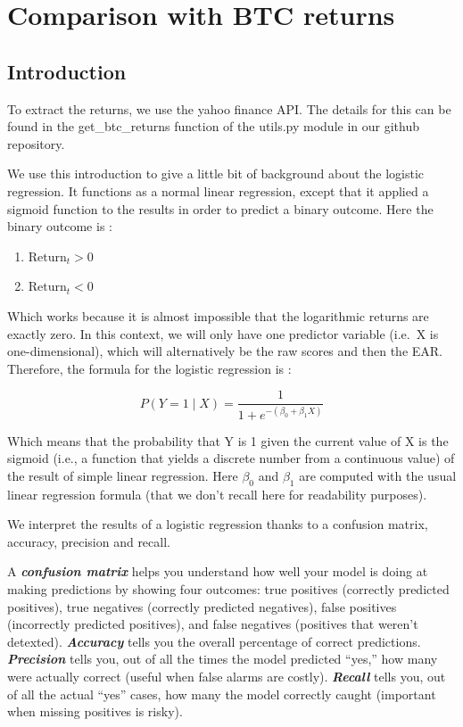 \documentclass[
  a4paper]{article}
\begin{document}
\hypertarget{comparison-with-btc-returns}{%
\section{Comparison with BTC
returns}\label{comparison-with-btc-returns}}

\hypertarget{introduction-1}{%
\subsection{Introduction}\label{introduction-1}}

To extract the returns, we use the yahoo finance
\textcite{yahoo_finance} API. The details for this can be found in the
get\_btc\_returns function of the utils.py module in our github
repository.

We use this introduction to give a little bit of background about the
logistic regression. It functions as a normal linear regression, except
that it applied a sigmoid function to the results in order to predict a
binary outcome. Here the binary outcome is :

\begin{enumerate}
\def\labelenumi{\arabic{enumi}.}
\item
  \(\text{Return}_t > 0\)
\item
  \(\text{Return}_t < 0\)
\end{enumerate}

Which works because it is almost impossible that the logarithmic returns
are exactly zero. In this context, we will only have one predictor
variable (i.e.~X is one-dimensional), which will alternatively be the
raw scores and then the EAR. Therefore, the formula for the logistic
regression is :

\[
P(Y = 1 \mid X) = \frac{1}{1 + e^{-(\beta_0 + \beta_1 X)}}
\]

Which means that the probability that Y is 1 given the current value of
X is the sigmoid (i.e., a function that yields a discrete number from a
continuous value) of the result of simple linear regression. Here
\(\beta_0\) and \(\beta_1\) are computed with the usual linear
regression formula (that we don't recall here for readability purposes).

We interpret the results of a logistic regression thanks to a confusion
matrix, accuracy, precision and recall.

A \textbf{\emph{confusion matrix}} helps you understand how well your
model is doing at making predictions by showing four outcomes: true
positives (correctly predicted positives), true negatives (correctly
predicted negatives), false positives (incorrectly predicted positives),
and false negatives (positives that weren't detexted).
\textbf{\emph{Accuracy}} tells you the overall percentage of correct
predictions. \textbf{\emph{Precision}} tells you, out of all the times
the model predicted ``yes,'' how many were actually correct (useful when
false alarms are costly). \textbf{\emph{Recall}} tells you, out of all
the actual ``yes'' cases, how many the model correctly caught (important
when missing positives is risky).
\end{document}
